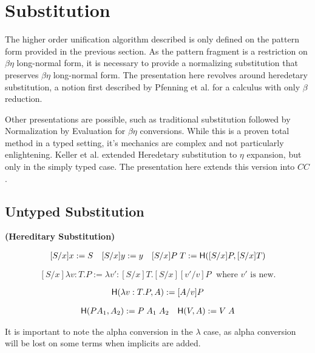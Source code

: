 \section{Substitution}

The higher order unification algorithm described is only defined on the pattern form provided in the previous section.
As the pattern fragment is a restriction on $\beta\eta$ long-normal form, it is necessary to provide a normalizing
substitution that preserves $\beta\eta$ long-normal form.  The presentation here
revolves around heredetary substitution, a notion first described by Pfenning et al. \citep{pfenning1991logic} for
a calculus with only $\beta$ reduction.

Other presentations are possible, such as traditional substitution followed by Normalization by Evaluation 
for $\beta\eta$ conversions\citep{abel2010towards}. 
While this is a proven total method in a typed setting, it's mechanics
are complex and not particularly enlightening.  
Keller et al. \citep{keller2010normalization}
extended Heredetary substitution to $\eta$ expansion, but only in the simply typed case. 
The presentation here extends this version into $CC$.

\subsection{Untyped Substitution}

\begin{definition}
\textbf{(Hereditary Substitution)} 

\[ \begin{array}[3]{llr}
[ S / x ] x := S
&
[S / x] y := y
&
[S / x] P\;T := \m{H}([S/x] P, [S/x]T)
\end{array} \]

\[
[S / x] \lambda v : T . P := \lambda v' : [S/x]T . [S/x][v'/v]P
\;
\text{  where $v'$ is new.}
\]

\[ 
\mathsf{H}(\lambda v : T . P , A) := [A/v] P
\]

\[ \begin{array}[2]{lr}
\m{H}(P A_1 , A_2) := P\;A_1\;A_2
&
\m{H}(V , A) := V\; A
\end{array} \]

\label{def:shered}
\end{definition}

It is important to note the alpha conversion in the $\lambda$ case, as alpha conversion will be lost on 
some terms when implicits are added.

